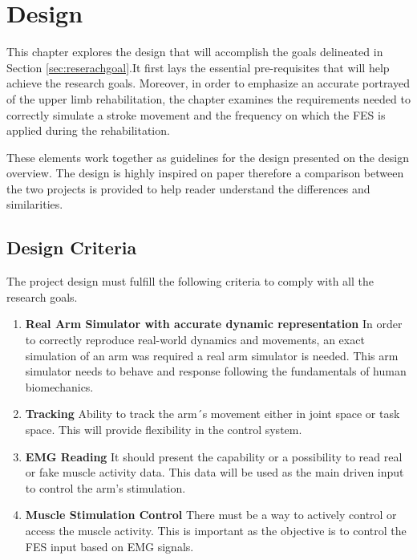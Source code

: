 \chapter{Design} \label{Design}

This chapter explores the design that will accomplish the goals delineated in Section \ref{sec:reserachgoal}.It first lays the essential pre-requisites that will help achieve the research goals. Moreover, in order to emphasize an accurate portrayed of the upper limb rehabilitation, the chapter examines the requirements needed to correctly simulate a stroke movement and the frequency on which the FES is applied during the rehabilitation. 

These elements work together as guidelines for the design presented on the design overview. The design is highly inspired on paper \cite{QSC} therefore a comparison between the two projects is provided to help reader understand the differences and similarities.


\section{Design Criteria} 

The project design must fulfill the following criteria to comply with all the research goals.

\begin{enumerate}
    \item \textbf{Real Arm Simulator with accurate dynamic representation} In order to correctly reproduce real-world dynamics and movements, an exact simulation of an arm was required a real arm simulator is needed. This arm simulator needs to behave and response following the fundamentals of human biomechanics.
    \item \textbf{Tracking} Ability to track the arm´s movement either in joint space or task space. This will provide flexibility in the control system. 
    \item \textbf{EMG Reading} It should present the capability or a possibility to read real or fake muscle activity data. This data will be used as the main driven input to control the arm's stimulation.
    \item \textbf{Muscle Stimulation Control} There must be a way to actively control or access the muscle activity. This is important as the objective is to control the FES input based on EMG signals. 
    
\end{enumerate}

